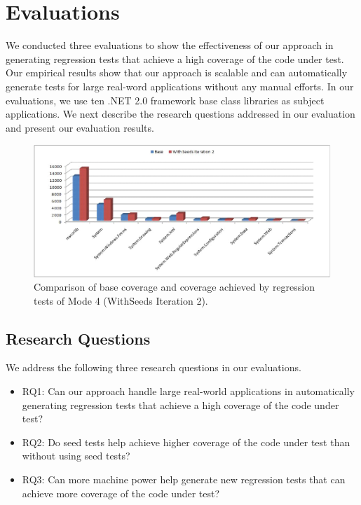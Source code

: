 \section{Evaluations}
\label{sec:eval}

We conducted three evaluations to show the effectiveness of our approach in
generating regression tests that achieve a high coverage of the code under test. 
Our empirical results show that our approach is scalable and can automatically generate
tests for large real-word applications without any manual efforts. In our evaluations, 
we use ten .NET 2.0 framework base class libraries as subject applications. We next describe
the research questions addressed in our evaluation and present our evaluation results.

\begin{figure}[t]
\centering
\includegraphics[scale=0.70,clip]{figs/RQ2_1.eps}\vspace*{-1ex}
\caption{Comparison of base coverage and coverage achieved by regression tests of Mode 4 (WithSeeds Iteration 2).} \label{fig:rq2}
\end{figure}

\subsection{Research Questions}
\label{sec:research}

We address the following three research questions in our evaluations.

\begin{itemize}
\item RQ1: Can our approach handle large real-world applications in automatically generating
regression tests that achieve a high coverage of the code under test? 
\item RQ2: Do seed tests help achieve higher coverage of the code under test than without using seed tests?
\item RQ3: Can more machine power help generate new regression tests that can achieve
more coverage of the code under test?
\end{itemize}

